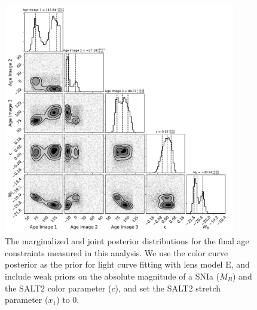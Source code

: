 \documentclass[12pt,dvipsnames]{article}
\begin{document}
\begin{figure}
    \centering
    \includegraphics[width=0.9\textwidth]{Paper/Figures/lc_modelH_color_corner.pdf}
    \caption{The marginalized and joint posterior distributions for the final age constraints measured in this analysis. We use the color curve posterior as the prior for light curve fitting with lens model E, and include weak priors on the absolute magnitude of a SNIa ($M_B$) and the SALT2 color parameter ($c$), and set the SALT2 stretch parameter ($x_1$) to 0.}
    \label{fig:corner_combined}
\end{figure}
\end{document}
